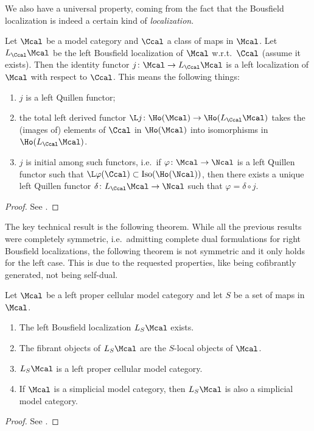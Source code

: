         We also have a universal property, coming from the fact that the Bousfield localization is indeed a certain kind of \emph{localization}.
        \begin{prop}
            \label{prop:bousfield_localization_universal}
            Let $\Mcal$ be a model category and $\Ccal$ a class of maps in $\Mcal$. Let $L_{\Ccal}\Mcal$ be the left Bousfield localization of $\Mcal$ w.r.t.\ $\Ccal$ (assume it exists). Then the identity functor $j\colon \Mcal \to L_{\Ccal}\Mcal$ is a left localization of $\Mcal$ with respect to $\Ccal$. This means the following things:
            \begin{enumerate}
                \item $j$ is a left Quillen functor;
                \item the total left derived functor $\L j\colon \Ho(\Mcal) \to \Ho(L_{\Ccal}\Mcal)$ takes the (images of) elements of $\Ccal$ in $\Ho(\Mcal)$ into isomorphisms in $\Ho(L_{\Ccal}\Mcal)$.
                \item $j$ is initial among such functors, i.e.\ if $\varphi\colon \Mcal \to \Ncal$ is a left Quillen functor such that $\L \varphi(\Ccal) \subset \mathrm{Iso}(\Ho(\Ncal))$, then there exists a unique left Quillen functor $\delta\colon L_{\Ccal}\Mcal \to \Ncal$ such that $\varphi = \delta \circ j$.
            \end{enumerate}
        \end{prop}
        \begin{proof}
            See \cite[Theorem~3.3.19]{Hirs:loc}.
        \end{proof}

        The key technical result is the following theorem. While all the previous results were completely symmetric, i.e.\ admitting complete dual formulations for right Bousfield localizations, the following theorem is not symmetric and it only holds for the left case. This is due to the requested properties, like being cofibrantly generated, not being self-dual.
        \pagebreak
        \begin{thm}
            \label{thm:existence_bousfield_localization}
            Let $\Mcal$ be a left proper cellular model category and let $S$ be a set of maps in $\Mcal$. 
            \begin{enumerate}
                \item The left Bousfield localization $L_S \Mcal$ exists.
                \item The fibrant objects of $L_S \Mcal$ are the $S$-local objects of $\Mcal$.
                \item $L_S \Mcal$ is a left proper cellular model category.
                \item If $\Mcal$ is a simplicial model category, then $L_S \Mcal$ is also a simplicial model category.
            \end{enumerate}
        \end{thm}
        \begin{proof}
            See \cite[Theorem~4.1.1]{Hirs:loc}.
        \end{proof}        
    
    